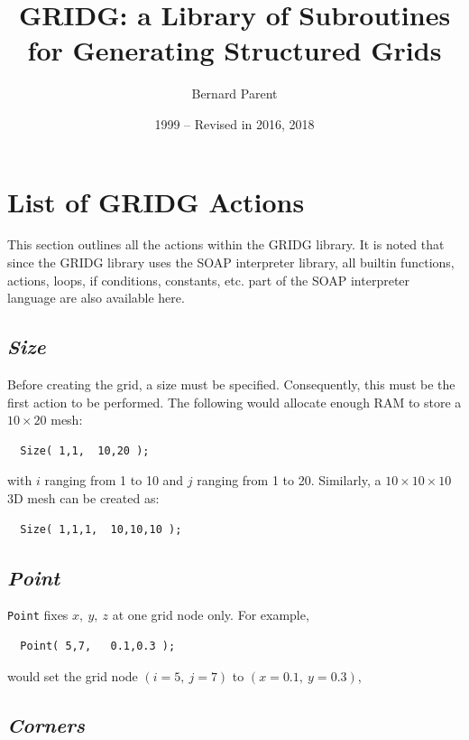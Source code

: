 \documentclass{warpdoc}
\author{
  Bernard Parent
}
\title{
  GRIDG: a Library of Subroutines for Generating Structured Grids 
}
\date{
  1999 -- Revised in 2016, 2018
}
\begin{document}
  \pagestyle{headings}
  \setcounter{page}{1}
  \makewarpdoctitle
  \tableofcontents




\sloppy

\section{List of GRIDG Actions}

This section outlines all the
actions within the GRIDG library. It is noted
that since the GRIDG library uses the SOAP interpreter library, all
builtin functions, actions, loops, if conditions, constants, etc.
part of the SOAP interpreter language are also available here.

\subsection{\emph{Size}}

Before creating the grid, a size must be specified.
Consequently, this must be the first action to be performed.
The following would allocate enough RAM to store a $10\times 20$
mesh:
%
\begin{verbatim}
  Size( 1,1,  10,20 );
\end{verbatim}
%
with $i$ ranging from 1 to 10 and $j$ ranging from 1 to 20. Similarly,
a $10 \times 10 \times 10$ 3D mesh can be created as:
%
\begin{verbatim}
  Size( 1,1,1,  10,10,10 );
\end{verbatim}
%

\subsection{\emph{Point}}

\verb|Point| fixes $x,~y,~z$ at one grid node only.
For example,
%
\begin{verbatim}
  Point( 5,7,   0.1,0.3 );
\end{verbatim}
%
would set the grid node $\left( i=5,~j=7 \right)$ to $\left( x=0.1,~y=0.3\right)$,

\subsection{\emph{Corners}}
\end{document}
